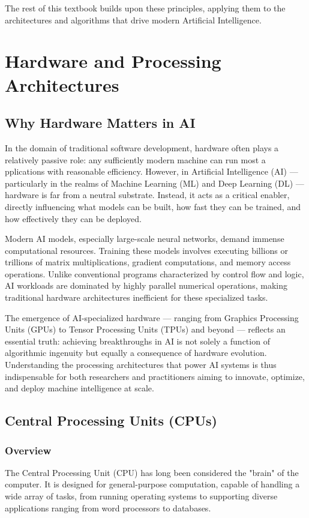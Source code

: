 \documentclass[openany]{book}
\begin{document}
The rest of this textbook builds upon these principles, applying them to the 
architectures and algorithms that drive modern Artificial Intelligence.

\chapter{Hardware and Processing Architectures}

\section{Why Hardware Matters in AI}

In the domain of traditional software development, hardware often plays a 
relatively passive role: any sufficiently modern machine can run most a
pplications with reasonable efficiency. However, in Artificial Intelligence (AI) 
— particularly in the realms of Machine Learning (ML) and Deep Learning (DL) — 
hardware is far from a neutral substrate. Instead, it acts as a critical 
enabler, directly influencing what models can be built, how fast they can be 
trained, and how effectively they can be deployed.

Modern AI models, especially large-scale neural networks, demand immense 
computational resources. Training these models involves executing billions or 
trillions of matrix multiplications, gradient computations, and memory access 
operations. Unlike conventional programs characterized by control flow and 
logic, AI workloads are dominated by highly parallel numerical operations, 
making traditional hardware architectures inefficient for these specialized 
tasks.

The emergence of AI-specialized hardware — ranging from Graphics Processing 
Units (GPUs) to Tensor Processing Units (TPUs) and beyond — reflects an 
essential truth: achieving breakthroughs in AI is not solely a function of 
algorithmic ingenuity but equally a consequence of hardware evolution. 
Understanding the processing architectures that power AI systems is thus 
indispensable for both researchers and practitioners aiming to innovate, 
optimize, and deploy machine intelligence at scale.

\section{Central Processing Units (CPUs)}

\subsection{Overview}
The Central Processing Unit (CPU) has long been considered the "brain" of the 
computer. It is designed for general-purpose computation, capable of handling a 
wide array of tasks, from running operating systems to supporting diverse 
applications ranging from word processors to databases.
\end{document}
